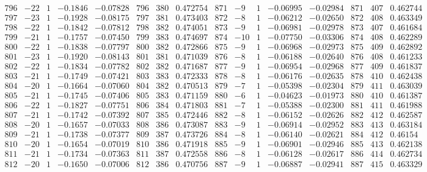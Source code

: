 \documentclass[11pt,reqno,a4letter]{article}
\numberwithin{figure}{section}
\numberwithin{table}{section}
\theoremstyle{plain}
\numberwithin{theorem}{section}
\theoremstyle{definition}
\begin{document}
\begin{table}[ht]
\begin{equation*}
{\begin{array}{ccccc|ccc|ccccc|ccc}
 796 & -22 & 1 & -0.1846 & -0.07828 & 796 & 380 & 0.472754 & 871 & -9 & 1 & -0.06995 & -0.02984 & 871 & 407 & 0.462744 \\
 797 & -23 & 1 & -0.1928 & -0.08175 & 797 & 381 & 0.473403 & 872 & -8 & 1 & -0.06212 & -0.02650 & 872 & 408 & 0.463349 \\
 798 & -22 & 1 & -0.1842 & -0.07812 & 798 & 382 & 0.474051 & 873 & -9 & 1 & -0.06981 & -0.02978 & 873 & 407 & 0.461684 \\
 799 & -21 & 1 & -0.1757 & -0.07450 & 799 & 383 & 0.474697 & 874 & -10 & 1 & -0.07750 & -0.03306 & 874 & 408 & 0.462289 \\
 800 & -22 & 1 & -0.1838 & -0.07797 & 800 & 382 & 0.472866 & 875 & -9 & 1 & -0.06968 & -0.02973 & 875 & 409 & 0.462892 \\
 801 & -23 & 1 & -0.1920 & -0.08143 & 801 & 381 & 0.471039 & 876 & -8 & 1 & -0.06188 & -0.02640 & 876 & 408 & 0.461233 \\
 802 & -22 & 1 & -0.1834 & -0.07782 & 802 & 382 & 0.471687 & 877 & -9 & 1 & -0.06954 & -0.02968 & 877 & 409 & 0.461837 \\
 803 & -21 & 1 & -0.1749 & -0.07421 & 803 & 383 & 0.472333 & 878 & -8 & 1 & -0.06176 & -0.02635 & 878 & 410 & 0.462438 \\
 804 & -20 & 1 & -0.1664 & -0.07060 & 804 & 382 & 0.470513 & 879 & -7 & 1 & -0.05398 & -0.02304 & 879 & 411 & 0.463039 \\
 805 & -21 & 1 & -0.1745 & -0.07406 & 805 & 383 & 0.471159 & 880 & -6 & 1 & -0.04623 & -0.01973 & 880 & 410 & 0.461387 \\
 806 & -22 & 1 & -0.1827 & -0.07751 & 806 & 384 & 0.471803 & 881 & -7 & 1 & -0.05388 & -0.02300 & 881 & 411 & 0.461988 \\
 807 & -21 & 1 & -0.1742 & -0.07392 & 807 & 385 & 0.472446 & 882 & -8 & 1 & -0.06152 & -0.02626 & 882 & 412 & 0.462587 \\
 808 & -20 & 1 & -0.1657 & -0.07033 & 808 & 386 & 0.473087 & 883 & -9 & 1 & -0.06914 & -0.02952 & 883 & 413 & 0.463184 \\
 809 & -21 & 1 & -0.1738 & -0.07377 & 809 & 387 & 0.473726 & 884 & -8 & 1 & -0.06140 & -0.02621 & 884 & 412 & 0.46154 \\
 810 & -20 & 1 & -0.1654 & -0.07019 & 810 & 386 & 0.471918 & 885 & -9 & 1 & -0.06901 & -0.02946 & 885 & 413 & 0.462138 \\
 811 & -21 & 1 & -0.1734 & -0.07363 & 811 & 387 & 0.472558 & 886 & -8 & 1 & -0.06128 & -0.02617 & 886 & 414 & 0.462734 \\
 812 & -20 & 1 & -0.1650 & -0.07006 & 812 & 386 & 0.470756 & 887 & -9 & 1 & -0.06887 & -0.02941 & 887 & 415 & 0.463329 \\

\end{array}}
\end{equation*}
\end{table}
\end{document}

